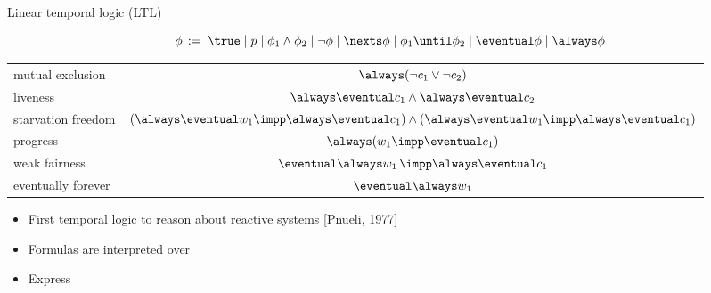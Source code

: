 \documentclass{beamer}
\begin{document}
\begin{slide}{Linear temporal logic (LTL)}\label{s:44}
\small

\[
\phi\, := \; \true \mid p \mid  \phi_1 \wedge \phi_2 \mid \neg \phi \mid \nexts \phi \mid  \phi_1 \until \phi_2 \mid \eventual \phi \mid \always \phi
\]
\vspace{0.5cm}
\begin{center}
\begin{tabular}{|l|c|}
\hline
mutual exclusion  & $\always (\neg c_1 \vee \neg c_2)$ \\
 liveness & $\always \eventual c_1 \wedge \always \eventual c_2$\\
starvation freedom  & $(\always \eventual w_1 \impp \always \eventual c_1) \wedge
(\always \eventual w_1 \impp \always \eventual c_1)$ \\
progress & $\always (w_1 \impp \eventual c_1)$\\
weak fairness & $\eventual \always w_1 \, \impp \always \eventual c_1$\\
eventually forever & $\eventual \always w_1$\\
\hline
\end{tabular}  
\end{center}

\begin{itemize}
\item First temporal logic to reason about reactive systems [Pnueli, 1977]
\item Formulas are interpreted over 
\item Express 
\end{itemize}
\end{slide}
\end{document}
